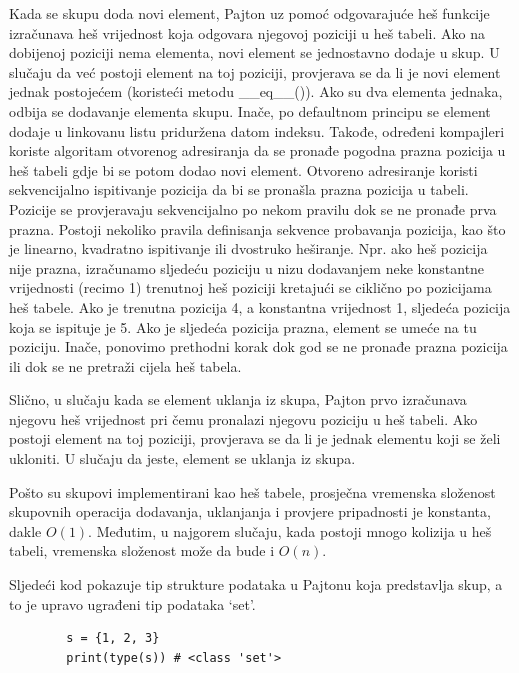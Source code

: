 Kada se skupu doda novi element, Pajton uz pomoć odgovarajuće heš funkcije izračunava   heš vrijednost koja odgovara  njegovoj  poziciji u heš tabeli. Ako na dobijenoj poziciji nema elementa, novi element se jednostavno dodaje u skup. U slučaju da već postoji element na toj poziciji, provjerava se da li je novi element jednak postojećem (koristeći metodu \_\_eq\_\_()). Ako su dva elementa jednaka, odbija se dodavanje elementa skupu. Inače, po defaultnom principu se element dodaje u linkovanu listu priduržena datom indeksu. Takođe, određeni kompajleri  
koriste algoritam  otvorenog adresiranja da se pronađe pogodna prazna pozicija u heš tabeli gdje bi se potom dodao novi element. 
Otvoreno adresiranje koristi sekvencijalno ispitivanje pozicija da bi se pronašla prazna pozicija u tabeli. Pozicije se provjeravaju sekvencijalno po nekom pravilu dok se ne pronađe prva prazna. Postoji nekoliko pravila  definisanja sekvence probavanja pozicija, kao što je linearno, kvadratno ispitivanje ili dvostruko heširanje. Npr. ako heš pozicija nije prazna, izračunamo sljedeću poziciju u nizu dodavanjem neke konstantne vrijednosti (recimo 1) trenutnoj heš poziciji kretajući se ciklično po pozicijama heš tabele. Ako je trenutna pozicija 4, a konstantna vrijednost 1, sljedeća pozicija koja se ispituje je 5. Ako je sljedeća pozicija prazna,  element se umeće na tu poziciju. Inače, ponovimo prethodni korak dok god se ne pronađe prazna pozicija ili dok se ne pretraži cijela heš tabela. 
 

Slično, u slučaju kada se element uklanja iz skupa, Pajton prvo izračunava njegovu heš vrijednost pri čemu  pronalazi njegovu poziciju u heš tabeli. Ako postoji element na toj poziciji,  provjerava se da li je jednak elementu koji se želi ukloniti. U slučaju da jeste, element se uklanja iz skupa. %

Pošto su skupovi implementirani kao heš tabele, prosječna vremenska složenost   skupovnih operacija  dodavanja, uklanjanja i provjere pripadnosti je konstanta, dakle $O(1)$. Međutim, u najgorem slučaju, kada postoji mnogo kolizija u heš tabeli, vremenska složenost može da bude i $O(n)$.

Sljedeći kod pokazuje tip strukture podataka u Pajtonu koja predstavlja skup, a to je upravo ugrađeni tip podataka `set'.

\begin{verbatim}
		s = {1, 2, 3}
		print(type(s)) # <class 'set'>
\end{verbatim} 



